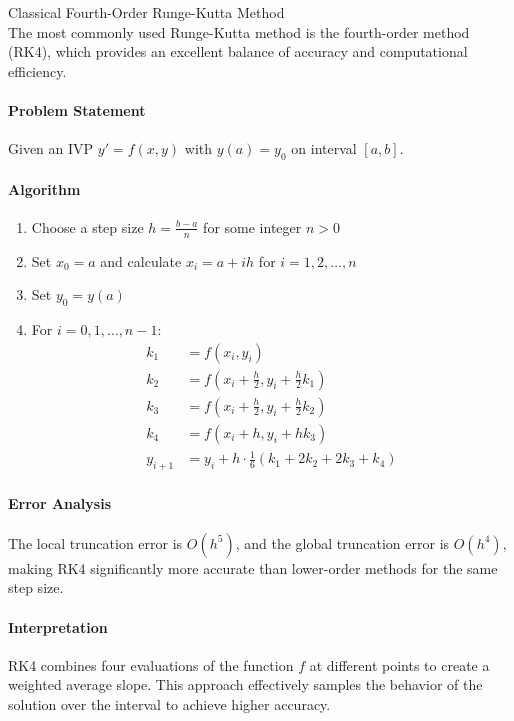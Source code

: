 \begin{KR}{Classical Fourth-Order Runge-Kutta Method}\\
The most commonly used Runge-Kutta method is the fourth-order method (RK4), which provides an excellent balance of accuracy and computational efficiency.

\paragraph{Problem Statement}
Given an IVP $y' = f(x,y)$ with $y(a) = y_0$ on interval $[a,b]$.

\paragraph{Algorithm}
\begin{enumerate}
    \item Choose a step size $h = \frac{b-a}{n}$ for some integer $n > 0$
    \item Set $x_0 = a$ and calculate $x_i = a + ih$ for $i = 1, 2, \ldots, n$
    \item Set $y_0 = y(a)$
    \item For $i = 0, 1, \ldots, n-1$:
    \begin{align*}
    k_1 &= f(x_i, y_i)\\
    k_2 &= f\left(x_i + \frac{h}{2}, y_i + \frac{h}{2}k_1\right)\\
    k_3 &= f\left(x_i + \frac{h}{2}, y_i + \frac{h}{2}k_2\right)\\
    k_4 &= f(x_i + h, y_i + hk_3)\\
    y_{i+1} &= y_i + h \cdot \frac{1}{6}(k_1 + 2k_2 + 2k_3 + k_4)
    \end{align*}
\end{enumerate}

\paragraph{Error Analysis}
The local truncation error is $O(h^5)$, and the global truncation error is $O(h^4)$, making RK4 significantly more accurate than lower-order methods for the same step size.

\paragraph{Interpretation}
RK4 combines four evaluations of the function $f$ at different points to create a weighted average slope. This approach effectively samples the behavior of the solution over the interval to achieve higher accuracy.
\end{KR}

